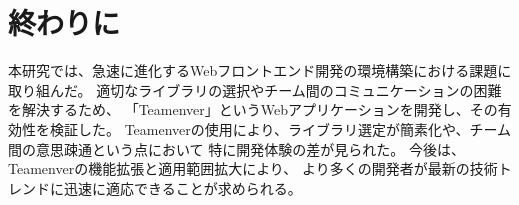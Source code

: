 \documentclass[main]{subfiles}
\begin{document}
\section{終わりに}
本研究では、急速に進化するWebフロントエンド開発の環境構築における課題に取り組んだ。
適切なライブラリの選択やチーム間のコミュニケーションの困難を解決するため、
「Teamenver」というWebアプリケーションを開発し、その有効性を検証した。
Teamenverの使用により、ライブラリ選定が簡素化や、チーム間の意思疎通という点において
特に開発体験の差が見られた。
今後は、Teamenverの機能拡張と適用範囲拡大により、
より多くの開発者が最新の技術トレンドに迅速に適応できることが求められる。
\end{document}
